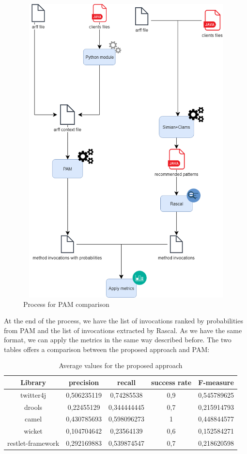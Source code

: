 \begin{figure}[H]
\includegraphics[width=16cm,height=16cm,keepaspectratio]{images/PAM.png}
\centering
  \caption{Process for PAM comparison}
  \label{fig:cmd}
\end{figure}
 At the end of the process, we have the list of invocations ranked by probabilities from PAM and the list of invocations extracted by Rascal. As we have the same format, we can apply the metrics in the same way described before. The two tables offers a comparison between the proposed approach and PAM: 

\begin{table}[H]
  \caption{ Average values for the proposed approach }
  \label{Table:8}
 \begin{center}
\begin{tabular}{|c|c|c|c|c|}

\hline
 \textbf{Library} & \textbf{precision}  & \textbf{recall} & \textbf{success rate} & \textbf{F-measure} \\ 
\hline
 twitter4j &  0,506235119 & 0,74285538 &  0,9 & 0,545789625 \\
\hline
drools & 0,22455129 &   0,344444445 & 0,7 & 0,215914793\\
\hline
camel & 0,430785693  & 0,598096273 & 1 & 0,448844577 \\
\hline 
wicket & 0,104704642 & 0,23564139 & 0,6 & 0,152584271 \\
\hline
restlet-framework &  0,292169883 &  0,539874547 & 0,7 & 0,218620598  \\
\hline
\end{tabular}
\end{center}
\end{table} 

